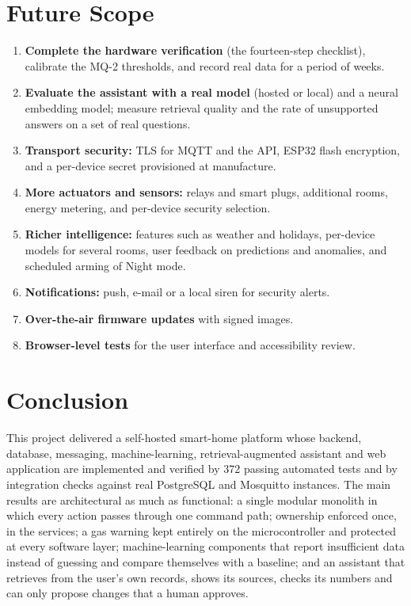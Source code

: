 \documentclass[12pt,a4paper,oneside]{report}
\begin{document}
\chapter{Future Scope}
\label{ch:future}
\begin{enumerate}
  \item \textbf{Complete the hardware verification} (the fourteen-step checklist), calibrate the MQ-2 thresholds, and record real data for a period of weeks.
  \item \textbf{Evaluate the assistant with a real model} (hosted or local) and a neural embedding model; measure retrieval quality and the rate of unsupported answers on a set of real questions.
  \item \textbf{Transport security:} TLS for MQTT and the API, ESP32 flash encryption, and a per-device secret provisioned at manufacture.
  \item \textbf{More actuators and sensors:} relays and smart plugs, additional rooms, energy metering, and per-device security selection.
  \item \textbf{Richer intelligence:} features such as weather and holidays, per-device models for several rooms, user feedback on predictions and anomalies, and scheduled arming of Night mode.
  \item \textbf{Notifications:} push, e-mail or a local siren for security alerts.
  \item \textbf{Over-the-air firmware updates} with signed images.
  \item \textbf{Browser-level tests} for the user interface and accessibility review.
\end{enumerate}

\chapter{Conclusion}
\label{ch:conclusion}
This project delivered a self-hosted smart-home platform whose backend, database, messaging, machine-learning, retrieval-augmented assistant and web application are implemented and verified by 372 passing automated tests and by integration checks against real PostgreSQL and Mosquitto instances. The main results are architectural as much as functional: a single modular monolith in which every action passes through one command path; ownership enforced once, in the services; a gas warning kept entirely on the microcontroller and protected at every software layer; machine-learning components that report insufficient data instead of guessing and compare themselves with a baseline; and an assistant that retrieves from the user's own records, shows its sources, checks its numbers and can only propose changes that a human approves.
\end{document}
